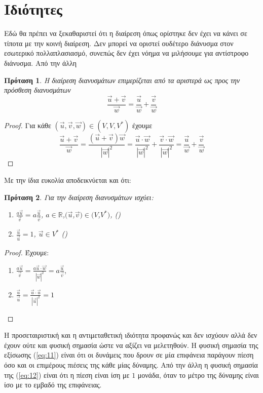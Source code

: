\documentclass[12pt]{article}
\newtheorem{proposition}{Πρόταση}
\begin{document}
\section{Ιδιότητες}
Εδώ θα πρέπει να ξεκαθαριστεί ότι η διαίρεση όπως ορίστηκε δεν έχει να κάνει σε τίποτα με την κοινή διαίρεση. Δεν μπορεί να οριστεί ουδέτερο διάνυσμα στον εσωτερικό πολλαπλασιασμό, συνεπώς δεν έχει νόημα να μιλήσουμε για αντίστροφο διάνυσμα. Από την άλλη
\begin{proposition}
  Η διαίρεση διανυσμάτων επιμερίζεται από τα αριστερά ως προς την πρόσθεση διανυσμάτων
  \begin{equation} \label{eq:10}
    \frac{\vec{u}+\vec{v}}{\vec{w}}=\frac{\vec{u}}{\vec{w}}+\frac{\vec{v}}{\vec{w}}
  \end{equation}
\end{proposition}
\begin{proof}
  Για κάθε $(\vec{u},\vec{v},\vec{w})\in (V,V,V^*)$ έχουμε
  \begin{equation*} \label{eq:9}
    \frac{\vec{u}+\vec{v}}{\vec{w}}=\frac{(\vec{u}+\vec{v})\vec{w}}{|\vec{w}|^2}=\frac{\vec{u}\cdot\vec{w}}{|\vec{w}|^2}+\frac{\vec{v}\cdot\vec{w}}{\left|\vec{w}\right|^2} = \frac{\vec{u}}{\vec{w}}+\frac{\vec{v}}{\vec{w}}
  \end{equation*}
\end{proof}
Με την ίδια ευκολία αποδεικνύεται και ότι:
\begin{proposition}
  Για την διαίρεση διανυσμάτων ισχύει:
  \begin{enumerate}
       \label{eq:11}
    \item $\displaystyle \frac{a\vec{u}}{\vec{v}}=a\frac{\vec{u}}{\vec{v}}$, $a\in\mathbb{R}$,$(\vec{u}$,$\vec{v})\in (V$,$V^*)$, \hfill \textnormal{()}   \label{eq:12}
    \item $\displaystyle \frac{\vec{u}}{\vec{u}}=1$, $\vec{u}\in V^*$ \hfill \textnormal{()}
  \end{enumerate}
\end{proposition}
\begin{proof}
  Έχουμε:
  \begin{enumerate}
    \item $\displaystyle \frac{a\vec{u}}{\vec{v}}=\frac{a\vec{u}\cdot\vec{w}}{|\vec{w}|^2}=a\frac{\vec{u}}{\vec{v}}$,
    \item $\displaystyle \frac{\vec{u}}{\vec{u}}=\frac{\vec{u}\cdot\vec{u}}{|\vec{u}|^2}=1$
  \end{enumerate}
\end{proof}
Η προσεταιριστική και η αντιμεταθετική ιδιότητα προφανώς και δεν ισχύουν αλλά δεν έχουν ούτε και φυσική σημασία ώστε να αξίζει να μελετηθούν. Η φυσική σημασία της εξίσωσης (\ref{eq:11}) είναι ότι οι δυνάμεις που δρουν σε μία επιφάνεια παράγουν πίεση όσο και οι επιμέρους πιέσεις της κάθε μίας δύναμης. Από την άλλη η φυσική σημασία της (\ref{eq:12}) είναι ότι η πίεση είναι ίση με $1$ μονάδα, όταν το μέτρο της δύναμης είναι ίσο με το εμβαδό της επιφάνειας.
\end{document}
